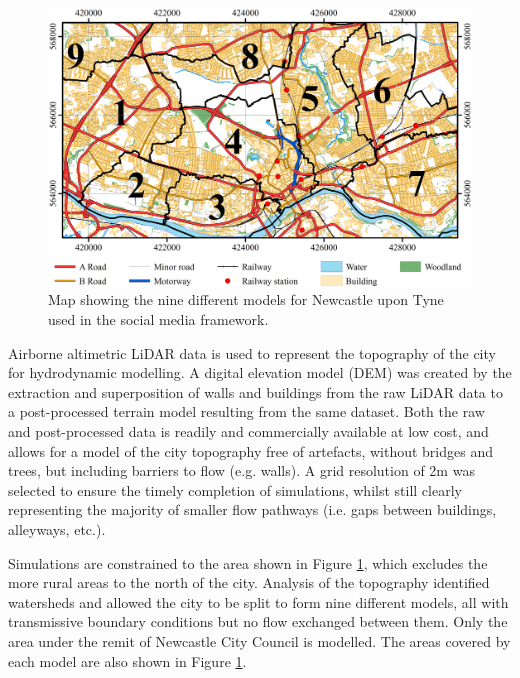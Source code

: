 \begin{figure}[tpb]
	\centering
	\includegraphics[width=1.0\textwidth]{nowcasting-figures/nclsm-map-models.png}
	\caption{Map showing the nine different models for Newcastle upon Tyne used in the social media framework.}
	\label{NclSM-Map-Models}
\end{figure}

Airborne altimetric LiDAR data is used to represent the topography of the city for hydrodynamic modelling. A digital elevation model (DEM) was created by the extraction and superposition of walls and buildings from the raw LiDAR data to a post-processed terrain model resulting from the same dataset. Both the raw and post-processed data is readily and commercially available at low cost, and allows for a model of the city topography free of artefacts, without bridges and trees, but including barriers to flow (e.g. walls). A grid resolution of 2m was selected to ensure the timely completion of simulations, whilst still clearly representing the majority of smaller flow pathways (i.e. gaps between buildings, alleyways, etc.).

Simulations are constrained to the area shown in Figure \ref{NclSM-Map-Models}, which excludes the more rural areas to the north of the city. Analysis of the topography identified watersheds and allowed the city to be split to form nine different models, all with transmissive boundary conditions but no flow exchanged between them. Only the area under the remit of Newcastle City Council is modelled. The areas covered by each model are also shown in Figure \ref{NclSM-Map-Models}.


